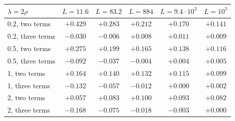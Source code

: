 \begin{tabular}{lccccc}
\toprule
$\lambda=2\rho$ & $L=11.6$ & $L=83.2$ & $L=884$ & $L=9.4\cdot 10^{3}$ & $L=10^{5}$\\
\midrule
0.2, two terms & $+0.429$ & $+0.283$ & $+0.212$ & $+0.170$ & $+0.141$\\
0.2, three terms & $-0.030$ & $-0.006$ & $+0.008$ & $+0.011$ & $+0.009$\\
0.5, two terms & $+0.275$ & $+0.199$ & $+0.165$ & $+0.138$ & $+0.116$\\
0.5, three terms & $-0.092$ & $-0.037$ & $-0.004$ & $+0.004$ & $+0.005$\\
1, two terms & $+0.164$ & $+0.140$ & $+0.132$ & $+0.115$ & $+0.099$\\
1, three terms & $-0.132$ & $-0.057$ & $-0.012$ & $+0.000$ & $+0.002$\\
2, two terms & $+0.057$ & $+0.083$ & $+0.100$ & $+0.093$ & $+0.082$\\
2, three terms & $-0.168$ & $-0.075$ & $-0.018$ & $-0.003$ & $+0.000$\\
\bottomrule
\end{tabular}
